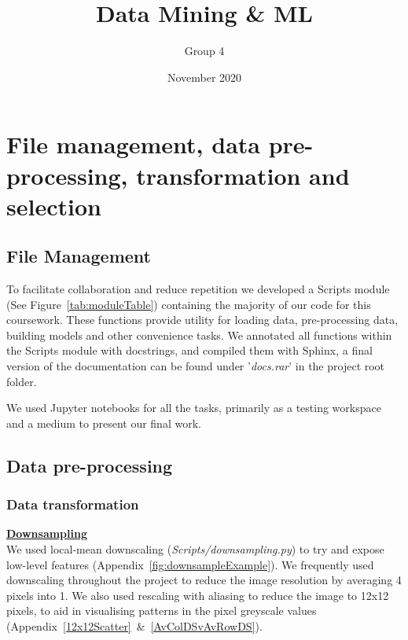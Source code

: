 \documentclass[11pt]{article}
\title{Data Mining \& ML}
\author{ Group 4 }
\date{November 2020}
\begin{document}
\maketitle

\pagebreak

\tableofcontents
\thispagestyle{empty}
\pagebreak
\setcounter{page}{1}

\pagebreak

\section{File management, data pre-processing, transformation and selection} 
\subsection{File Management}

To facilitate collaboration and reduce repetition we developed a Scripts module (See Figure~\ref{tab:moduleTable}) containing the majority of our code for this coursework. These functions provide utility for loading data, pre-processing data, building models and other convenience tasks. We annotated all functions within the Scripts module with docstrings, and compiled them with Sphinx, a final version of the documentation can be found under '\emph{docs.rar}' in the project root folder.
\par
We used Jupyter notebooks for all the tasks, primarily as a testing workspace and a medium to present our final work.

\subsection{Data pre-processing}\label{sec:transSel}
\subsubsection{Data transformation}
\textbf{\underline{Downsampling}}\\
We used local-mean downscaling (\emph{Scripts/downsampling.py}) to try and expose low-level features
(Appendix~\ref{fig:downsampleExample}). We frequently used downscaling throughout the project to reduce the image resolution by averaging 4 pixels into 1. 
We also used rescaling with aliasing to reduce the image to 12x12 pixels, to aid in visualising patterns in the pixel greyscale values (Appendix~\ref{12x12Scatter}~\&~\ref{AvColDSvAvRowDS}).
\par
\end{document}
